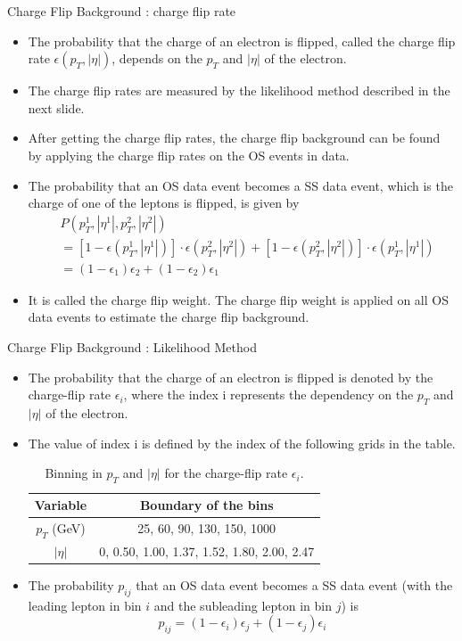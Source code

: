 \documentclass[mathserif,serif]{beamer}
\begin{document}
\begin{frame}{Charge Flip Background : charge flip rate}
\begin{itemize}
\item The probability that the charge of an electron is flipped, called the charge flip rate $\epsilon(p_T, |\eta|)$, depends on the $p_T$ and $|\eta|$ of the electron.
\item The charge flip rates are measured by the likelihood method described in the next slide.
\item After getting the charge flip rates, the charge flip background can be found by applying the charge flip rates on the OS events in data.
\item The probability that an OS data event becomes a SS data event, which is the charge of one of the leptons is flipped, is given by
\begin{align*}
& P(p^1_T, |\eta^1|, p^2_T, |\eta^2|) \\
&= [1 - \epsilon(p^1_T, |\eta^1|)] \cdot \epsilon(p^2_T, |\eta^2|) + [1 - \epsilon(p^2_T, |\eta^2|)] \cdot \epsilon(p^1_T, |\eta^1|) \\
&= (1 - \epsilon_1)\epsilon_2 + (1 - \epsilon_2)\epsilon_1
\end{align*}
\item It is called the charge flip weight. The charge flip weight is applied on all OS data events to estimate the charge flip background.
\end{itemize}
\end{frame}

\begin{frame}{Charge Flip Background : Likelihood Method}
\begin{itemize}
\item The probability that the charge of an electron is flipped is denoted by the charge-flip rate $\epsilon_i$, where the index i represents the dependency on the $p_T$ and $|\eta|$ of the electron.
\item The value of index i is defined by the index of the following grids in the table.

\begin{table}[htbp]
\centering
\begin{tabular}{|c|c|}
\hline
Variable & Boundary of the bins \\
\hline
$p_T$ (GeV) &  25, 60, 90, 130, 150, 1000 \\
\hline
$|\eta|$ & 0, 0.50, 1.00, 1.37, 1.52, 1.80, 2.00, 2.47 \\
\hline
\end{tabular}
\caption{Binning in $p_T$ and $|\eta|$ for the charge-flip rate $\epsilon_i$.}
\end{table}

\item The probability $p_{ij}$ that an OS data event becomes a SS data event (with the leading lepton in bin $i$ and the subleading lepton in bin $j$) is
\begin{equation*}
p_{ij} = (1 - \epsilon_i)\epsilon_j + (1 - \epsilon_j)\epsilon_i
\end{equation*}
\end{itemize}

\end{frame}
\end{document}
